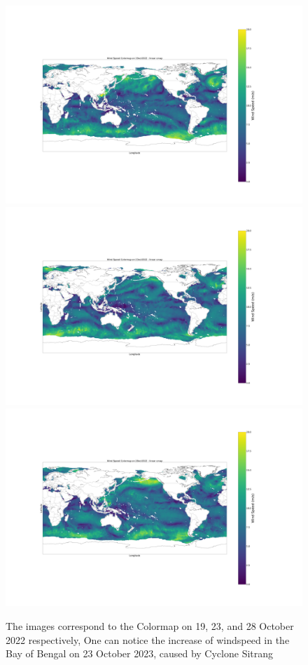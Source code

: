 \documentclass[conference]{IEEEtran}
\begin{document}
\begin{figure}
    \centering
    \includegraphics[scale=0.05]{images_deep/viridis_lin_19oct2022.png}
    \includegraphics[scale=0.05]{images_deep/viridis_lin_23oct2022.png}
    \includegraphics[scale=0.05]{images_deep/viridis_lin_28oct2022.png}
    \caption{The images correspond to the Colormap on 19, 23, and 28 October 2022 respectively, One can notice the increase of windspeed in the Bay of Bengal on 23 October 2023, caused by Cyclone Sitrang}
    \label{sitrang}
\end{figure}
\end{document}
